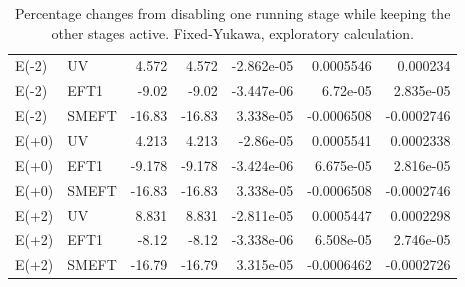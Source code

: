 \begin{table}[htbp]
\begin{tabular}{llrrrrr}
E(-2) & UV & 4.572 & 4.572 & -2.862e-05 & 0.0005546 & 0.000234 \\
E(-2) & EFT1 & -9.02 & -9.02 & -3.447e-06 & 6.72e-05 & 2.835e-05 \\
E(-2) & SMEFT & -16.83 & -16.83 & 3.338e-05 & -0.0006508 & -0.0002746 \\
E(+0) & UV & 4.213 & 4.213 & -2.86e-05 & 0.0005541 & 0.0002338 \\
E(+0) & EFT1 & -9.178 & -9.178 & -3.424e-06 & 6.675e-05 & 2.816e-05 \\
E(+0) & SMEFT & -16.83 & -16.83 & 3.338e-05 & -0.0006508 & -0.0002746 \\
E(+2) & UV & 8.831 & 8.831 & -2.811e-05 & 0.0005447 & 0.0002298 \\
E(+2) & EFT1 & -8.12 & -8.12 & -3.338e-06 & 6.508e-05 & 2.746e-05 \\
E(+2) & SMEFT & -16.79 & -16.79 & 3.315e-05 & -0.0006462 & -0.0002726 \\
\hline
\end{tabular}
\caption{Percentage changes from disabling one running stage while keeping the other stages active. Fixed-Yukawa, exploratory calculation.}
\label{tab:generalised_running_d-2}
\end{table}
